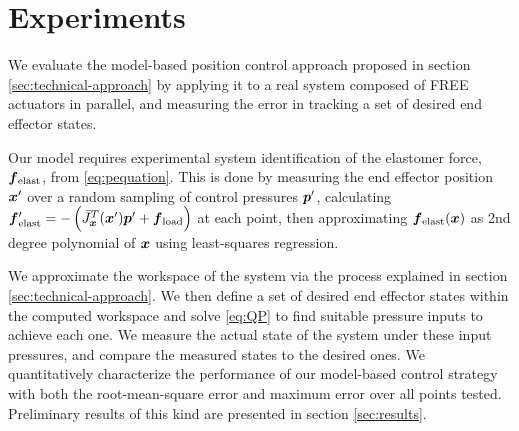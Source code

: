 \section{Experiments}   \label{sec:experiments}

We evaluate the model-based position control approach proposed in section \ref{sec:technical-approach} by applying it to a real system composed of FREE actuators in parallel, and measuring the error in tracking a set of desired end effector states. 


Our model requires experimental system identification of the elastomer force, $\f_\tx{elast}$, from \eqref{eq:pequation}. This is done by measuring the end effector position $\x'$ over a random sampling of control pressures $\p'$, calculating $\f_\tx{elast}' = - \left( \J_{\x}^T (\x') \p' + \f_\tx{load} \right)$ at each point, then approximating $\f_\tx{elast} (\x)$ as 2nd degree polynomial of $\x$ using least-squares regression.

We approximate the workspace of the system via the process explained in section \ref{sec:technical-approach}. We then define a set of desired end effector states within the computed workspace and solve \eqref{eq:QP} to find suitable pressure inputs to achieve each one. We measure the actual state of the system under these input pressures, and compare the measured states to the desired ones. We quantitatively characterize the performance of our model-based control strategy with both the root-mean-square error and maximum error over all points tested. Preliminary results of this kind are presented in section \ref{sec:results}.


